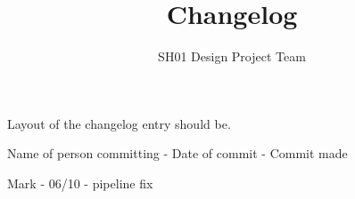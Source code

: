 \documentclass{article}
\title{Changelog}
\author{SH01 Design Project Team}
\begin{document}
    \maketitle

    Layout of the changelog entry should be.
    
    Name of person committing - Date of commit - Commit made

    Mark - 06/10 - pipeline fix
\end{document}
